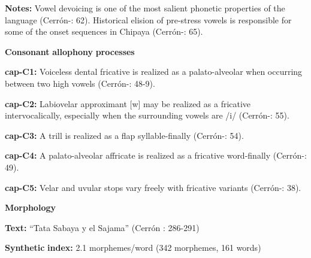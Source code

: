 \begin{styleBody}
\textbf{Notes:} Vowel devoicing is one of the most salient phonetic properties of the language (Cerrón-\citealt{Palomino2006}: 62). Historical elision of pre-stress vowels is responsible for some of the onset sequences in Chipaya (Cerrón-\citealt{Palomino2006}: 65).
\end{styleBody}

\begin{styleBody}
\textbf{Consonant} \textbf{allophony} \textbf{processes}
\end{styleBody}

\begin{styleBody}
\textbf{cap-C1:} Voiceless dental fricative is realized as a palato-alveolar when occurring between two high vowels (Cerrón-\citealt{Palomino2006}: 48-9).
\end{styleBody}

\begin{styleBody}
\textbf{cap-C2:} Labiovelar approximant [w] may be realized as a fricative intervocalically, especially when the surrounding vowels are /i/ (Cerrón-\citealt{Palomino2006}: 55).
\end{styleBody}

\begin{styleBody}
\textbf{cap-C3:} A trill is realized as a flap syllable-finally (Cerrón-\citealt{Palomino2006}: 54).
\end{styleBody}

\begin{styleBody}
\textbf{cap-C4:} A palato-alveolar affricate is realized as a fricative word-finally (Cerrón-\citealt{Palomino2006}: 49).
\end{styleBody}

\begin{styleBody}
\textbf{cap-C5:} Velar and uvular stops vary freely with fricative variants (Cerrón-\citealt{Palomino2006}: 38).
\end{styleBody}

\begin{styleBody}
\textbf{Morphology}
\end{styleBody}

\begin{styleBody}
\textbf{Text:} “Tata Sabaya y el Sajama” (Cerrón \citealt{Palomino2006}: 286-291)
\end{styleBody}

\begin{styleBody}
\textbf{Synthetic} \textbf{index:} 2.1 morphemes/word (342 morphemes, 161 words)
\end{styleBody}

